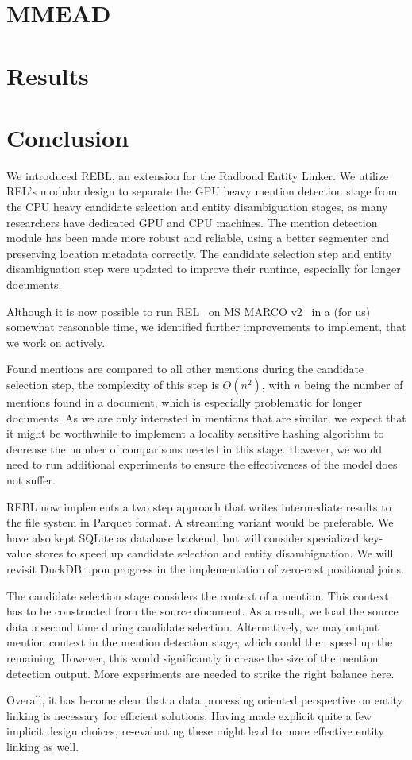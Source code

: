 \section{MMEAD}

\section{Results}

\section{Conclusion}
We introduced REBL, an extension for the Radboud Entity Linker. We utilize REL's modular design to separate the GPU heavy mention detection stage from the CPU heavy candidate selection and entity disambiguation stages, as many researchers have dedicated GPU and CPU machines. The mention detection module has been made more robust and reliable, using a better segmenter and preserving location metadata correctly.
The candidate selection step and entity disambiguation step were updated to improve their runtime, especially for longer documents. 

Although it is now possible to run REL~\cite{REL} on MS MARCO v2~\cite{msmarco} in a (for us) somewhat reasonable time, we identified further improvements to implement, that we work on actively. 

Found mentions are compared to all other mentions during the candidate selection step, the complexity of this step is $O(n^2)$, with $n$ being the number of mentions found in a document, which is especially problematic for longer documents. As we are only interested in mentions that are similar, we expect that it might be worthwhile to implement a locality sensitive hashing algorithm to decrease the number of comparisons needed in this stage. However, we would need to run additional experiments to ensure the effectiveness of the model does not suffer. 

REBL now implements a two step approach that writes intermediate results to the file system in Parquet format. A streaming variant would be preferable. We have also kept SQLite as database backend, but will consider specialized key-value stores to speed up candidate selection and entity disambiguation. We will revisit DuckDB upon progress in the implementation of zero-cost positional joins.  

The candidate selection stage considers the context of a mention. This context has to be constructed from the source document. As a result, we load the source data a second time during candidate selection. Alternatively, we may output mention context in the mention detection stage, which could then speed up the remaining. However, this would significantly increase the size of the mention detection output. More experiments are needed to strike the right balance here.

Overall, it has become clear that a data processing oriented perspective on entity linking is necessary for efficient solutions. Having made explicit quite a few implicit design choices, re-evaluating these might lead to more effective entity linking as well. 